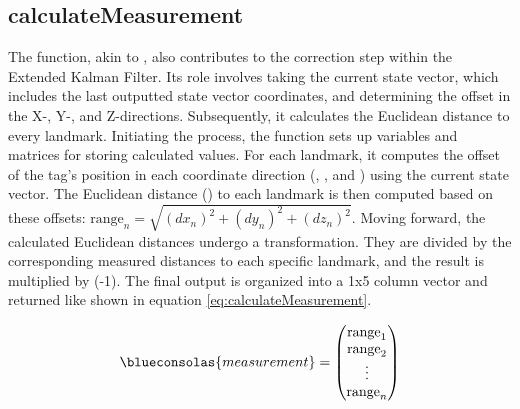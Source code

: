 \subsection{calculateMeasurement}
\label{sub:calculateMeasurement}
The  function, akin to , also contributes to the correction step within the Extended Kalman Filter. 
Its role involves taking the current state vector, which includes the last outputted state vector coordinates, and determining the offset in the X-, Y-, and Z-directions. Subsequently, it calculates the Euclidean distance to every landmark.
\vspace{4pt}
\newline
Initiating the process, the function sets up variables and matrices for storing calculated values. For each landmark, it computes the offset of the tag's position in each coordinate direction (, , and ) using the current state vector. The Euclidean distance () to each landmark is then computed based on these offsets:
$\textrm{range}_n = \sqrt{(dx_n)^2 + (dy_n)^2 + (dz_n)^2}$.
Moving forward, the calculated Euclidean distances undergo a transformation. They are divided by the corresponding measured distances to each specific landmark, and the result is multiplied by (-1). The final output is organized into a 1x5 column vector and returned like shown in equation \ref{eq:calculateMeasurement}. 

\begin{equation}
	\begin{centering}
		\blueconsolas{measurement} =
		\begin{pmatrix}
			\textrm{range}_1 \\
			\textrm{range}_2 \\
			\vdots \\
			\textrm{range}_n 
		\end{pmatrix}
	\end{centering}
	\label{eq:calculateMeasurement}
\end{equation}





